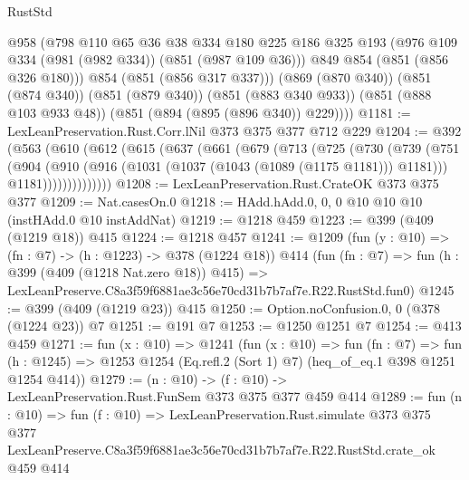 \begin{lexlean}{RustStd}
\begin{coremodule}
          @958
          (@798
            @110
            @65
            @36
            @38
            @334
            @180
            @225
            @186
            @325
            @193
            (@976 @109 @334 (@981 (@982 @334)) (@851 (@987 @109 @36)))
            @849
            @854
            (@851 (@856 @326 @180)))
          @854
          (@851 (@856 @317 @337)))
        (@869 (@870 @340))
        (@851 (@874 @340))
        (@851 (@879 @340))
        (@851 (@883 @340 @933))
        (@851 (@888 @103 @933 @48))
        (@851 (@894 (@895 (@896 @340)) @229))))
@1181 := LexLeanPreservation.Rust.Corr.lNil @373 @375 @377 @712 @229
@1204 := @392
    (@563
      (@610
        (@612
          (@615
            (@637
              (@661
                (@679
                  (@713
                    (@725
                      (@730
                        (@739
                          (@751
                            (@904
                              (@910
                                (@916 (@1031 (@1037 (@1043 (@1089 (@1175 @1181))) @1181)))
                                @1181))))))))))))))
@1208 := LexLeanPreservation.Rust.CrateOK @373 @375 @377
@1209 := Nat.casesOn.{0}
@1218 := HAdd.hAdd.{0, 0, 0} @10 @10 @10 (instHAdd.{0} @10 instAddNat)
@1219 := @1218 @459
@1223 := @399 (@409 (@1219 @18)) @415
@1224 := @1218 @457
@1241 := @1209
    (fun (y : @10) => (fn : @7) -> (h : @1223) -> @378 (@1224 @18))
    @414
    (fun (fn : @7) =>
    fun (h : @399 (@409 (@1218 Nat.zero @18)) @415) =>
    LexLeanPreserve.C8a3f59f6881ae3c56e70cd31b7b7af7e.R22.RustStd.fun0)
@1245 := @399 (@409 (@1219 @23)) @415
@1250 := Option.noConfusion.{0, 0} (@378 (@1224 @23)) @7
@1251 := @191 @7
@1253 := @1250 @1251 @7
@1254 := @413 @459
@1271 := fun (x : @10) =>
  @1241
    (fun (x : @10) =>
    fun (fn : @7) =>
    fun (h : @1245) => @1253 @1254 (Eq.refl.{2} (Sort 1) @7) (heq_of_eq.{1} @398 @1251 @1254 @414))
@1279 := (n : @10) -> (f : @10) -> LexLeanPreservation.Rust.FunSem @373 @375 @377 @459 @414
@1289 := fun (n : @10) =>
  fun (f : @10) =>
  LexLeanPreservation.Rust.simulate
    @373
    @375
    @377
    LexLeanPreserve.C8a3f59f6881ae3c56e70cd31b7b7af7e.R22.RustStd.crate_ok
    @459
    @414
\end{coremodule}
\end{lexlean}
